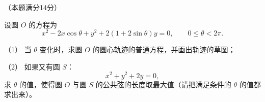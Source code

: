 \begin{question}
（本题满分14分）

设圆 $O$ 的方程为
\nopagebreak[4]
\[
x^2-2x\cos\theta+y^2+2(1+2\sin\theta)y=0,
\qquad 0\le\theta<2\pi.
\]

（1） 当 $\theta$ 变化时，求圆 $O$ 的圆心轨迹的普通方程，并画出轨迹的草图；

（2） 如果又有圆 $S$：
\nopagebreak[4]
\[
x^2+y^2+2y=0,
\]
求 $\theta$ 的值，使得圆 $O$ 与圆 $S$ 的公共弦的长度取最大值（请把满足条件的 $\theta$ 的值都求出来）。

\end{question}